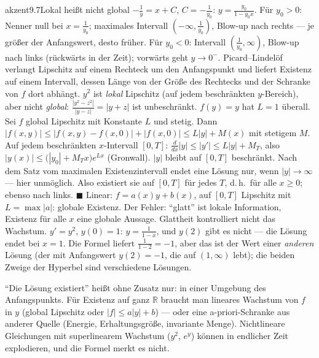 \begin{loesungkarte}{akzent}{9.7}{Lokal heißt nicht global}
$-\frac1y = x + C$, $C = -\frac1{y_0}$: $y = \frac{y_0}{1 - y_0x}$. Für $y_0 > 0$: Nenner null bei $x = \frac1{y_0}$; maximales Intervall $(-\infty, \frac1{y_0})$, Blow-up nach rechts --- je größer der Anfangswert, desto früher. Für $y_0 < 0$: Intervall $(\frac1{y_0}, \infty)$, Blow-up nach links (rückwärts in der Zeit); vorwärts geht $y\to0^{-}$.
Picard--Lindelöf verlangt Lipschitz auf einem Rechteck um den Anfangspunkt und liefert Existenz auf einem Intervall, dessen Länge von der Größe des Rechtecks und der Schranke von $f$ dort abhängt. $y^{2}$ ist \emph{lokal} Lipschitz (auf jedem beschränkten $y$-Bereich), aber nicht \emph{global}: $\frac{|y^{2} - z^{2}|}{|y - z|} = |y + z|$ ist unbeschränkt. $f(y) = y$ hat $L = 1$ überall.
Sei $f$ global Lipschitz mit Konstante $L$ und stetig. Dann $|f(x, y)|\le|f(x, y) - f(x, 0)| + |f(x, 0)|\le L|y| + M(x)$ mit stetigem $M$. Auf jedem beschränkten $x$-Intervall $[0, T]$: $\frac d{dx}|y|\le|y'|\le L|y| + M_T$, also $|y(x)|\le\bigl(|y_0| + M_Tx\bigr)e^{Lx}$ (Gronwall). $|y|$ bleibt auf $[0, T]$ beschränkt. Nach dem Satz vom maximalen Existenzintervall endet eine Lösung nur, wenn $|y|\to\infty$ --- hier unmöglich. Also existiert sie auf $[0, T]$ für jedes $T$, d.\,h.\ für alle $x\ge0$; ebenso nach links. $\blacksquare$ Linear: $f = a(x)y + b(x)$, auf $[0, T]$ Lipschitz mit $L = \max|a|$: globale Existenz.
Der Fehler: \enquote{glatt} ist lokale Information, Existenz für alle $x$ eine globale Aussage. Glattheit kontrolliert nicht das Wachstum. $y' = y^{2}$, $y(0) = 1$: $y = \frac1{1 - x}$, und $y(2)$ gibt es nicht --- die Lösung endet bei $x = 1$. Die Formel liefert $\frac1{1 - 2} = -1$, aber das ist der Wert einer \emph{anderen} Lösung (der mit Anfangswert $y(2) = -1$, die auf $(1, \infty)$ lebt); die beiden Zweige der Hyperbel sind verschiedene Lösungen.
\begin{fehler}\kastentext
\enquote{Die Lösung existiert} heißt ohne Zusatz nur: in einer Umgebung des Anfangspunkts. Für Existenz auf ganz $\mathbb R$ braucht man lineares Wachstum von $f$ in $y$ (global Lipschitz oder $|f|\le a|y| + b$) --- oder eine a-priori-Schranke aus anderer Quelle (Energie, Erhaltungsgröße, invariante Menge). Nichtlineare Gleichungen mit superlinearem Wachstum ($y^{2}$, $e^{y}$) können in endlicher Zeit explodieren, und die Formel merkt es nicht.

\end{fehler}
\end{loesungkarte}
